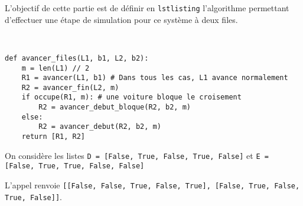 L'objectif de cette partie est de définir en \lstinline{lstlisting} l'algorithme permettant d'effectuer une étape
de simulation pour ce système à deux files.

\ifprof
\begin{corrige}~\\ \vspace{-.5cm}
\begin{lstlisting}
def avancer_files(L1, b1, L2, b2):
    m = len(L1) // 2
    R1 = avancer(L1, b1) # Dans tous les cas, L1 avance normalement
    R2 = avancer_fin(L2, m)
    if occupe(R1, m): # une voiture bloque le croisement
        R2 = avancer_debut_bloque(R2, b2, m)
    else:
        R2 = avancer_debut(R2, b2, m)
    return [R1, R2]
\end{lstlisting}
\end{corrige}
\else
\fi

On considère les listes \lstinline{D = [False, True, False, True, False]} et \lstinline{E = [False, True, True, False, False]}


\ifprof
\begin{corrige}
 L'appel renvoie \lstinline{[[False, False, True, False, True], [False, True, False, True, False]]}.
\end{corrige}
\else
\fi

